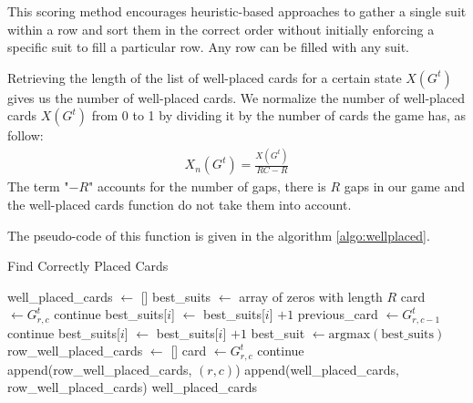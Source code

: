 This scoring method encourages heuristic-based approaches to gather a single suit within a row and sort them in the correct order without initially enforcing a specific suit to fill a particular row. Any row can be filled with any suit.

Retrieving the length of the list of well-placed cards for a certain state $X\left(G^t\right)$ gives us the number of well-placed cards. We normalize the number of well-placed cards $X\left(G^t\right)$ from 0 to 1 by dividing it by the number of cards the game has, as follow:
\begin{align}
X_n\left(G^t\right) = \frac{X\left(G^t\right)}{RC-R}
\end{align}
The term "$-R$" accounts for the number of gaps, there is $R$ gaps in our game and the well-placed cards function do not take them into account.

The pseudo-code of this function is given in the algorithm \ref{algo:wellplaced}.


\begin{algorithm}[H]
    \caption{Find Correctly Placed Cards}
    \label{algo:wellplaced}
    \begin{algorithmic}
        \State well\_placed\_cards $\gets$ []
            \State best\_suits $\gets$ array of zeros with length $R$
                \State card $\gets G^t_{r,c}$
                    \State continue
                \EndIf
                    \State best\_suits[$i$] $\gets$ best\_suits[$i$] $+ 1$
                \EndIf
                    \State previous\_card $\gets G^t_{r,c-1}$
                        \State continue
                    \EndIf
                        \State best\_suits[$i$] $\gets$ best\_suits[$i$] $+ 1$
                    \EndIf
                \EndIf
            \EndFor
            \State best\_suit $\gets \text{argmax}(\text{best\_suits})$
            \State row\_well\_placed\_cards $\gets$ []
                \State card $\gets G^t_{r,c}$
                    \State continue
                \EndIf
                    \State append(row\_well\_placed\_cards, $(r,c)$)
                \EndIf
            \EndFor
            \State append(well\_placed\_cards, row\_well\_placed\_cards)
        \EndFor
        \State \Return well\_placed\_cards
    \end{algorithmic}
\end{algorithm}

